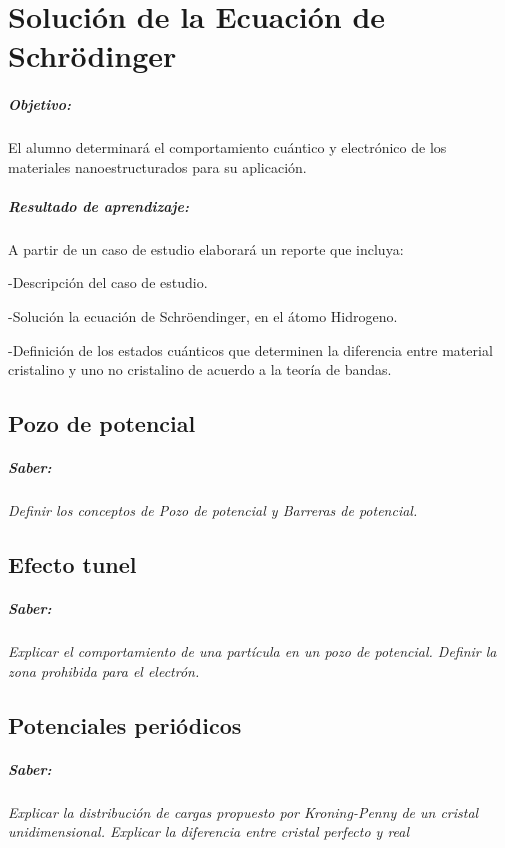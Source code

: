 \chapter{ Solución de la Ecuación de Schrödinger }
\paragraph{Objetivo: }
El alumno determinará el comportamiento cuántico y electrónico de los materiales nanoestructurados para su aplicación.

\paragraph{Resultado de aprendizaje: }
A partir de un caso de estudio elaborará un reporte que incluya:

-Descripción del caso de estudio.

-Solución la ecuación de Schröendinger, en el átomo Hidrogeno.

-Definición de los estados cuánticos que determinen la diferencia entre material cristalino y uno no cristalino de acuerdo a
la teoría de bandas.
 

\section{Pozo de potencial}
\paragraph{Saber: }
\textit{Definir los conceptos de Pozo de potencial y Barreras de potencial. }

\section{Efecto tunel}
\paragraph{Saber: }
\textit{Explicar el comportamiento 	de una partícula en un pozo de potencial. Definir la zona prohibida para el electrón.}

\section{Potenciales periódicos}
\paragraph{Saber: }
\textit{Explicar la distribución de	cargas propuesto por Kroning-Penny de un cristal unidimensional. Explicar la diferencia entre cristal perfecto y real}

